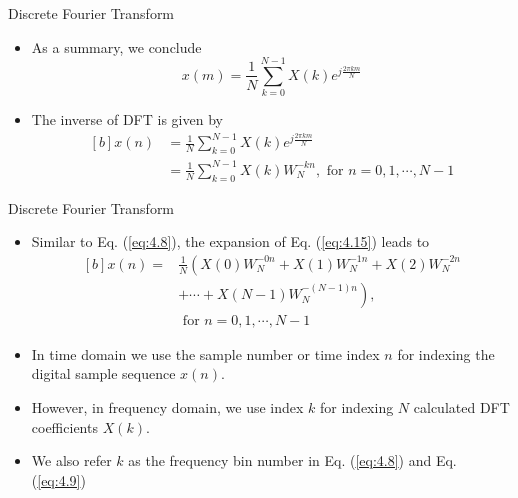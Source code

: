 \documentclass[pdflatex,compress,mathserif]{beamer}
\begin{document}
\begin{frame}{Discrete Fourier Transform}
    \begin{itemize}
        \item As a summary, we conclude
        \begin{equation}
            x(m) = \frac{1}{N} \sum_{k=0}^{N-1} X(k) e^{j\frac{2 \pi km}{N}}
        \end{equation}
        \item The inverse of DFT is given by
        \begin{equation}
            \begin{aligned}[b]
                x(n) &= \frac{1}{N} \sum_{k=0}^{N-1} X(k) e^{j\frac{2 \pi km}{N}} \\
                &= \frac{1}{N} \sum_{k=0}^{N-1} X(k) W_N^{-kn}, \text{ for } n=0,1,\cdots,N-1
            \end{aligned}
            \label{eq:4.15}
        \end{equation}
    \end{itemize}
\end{frame}

\begin{frame}{Discrete Fourier Transform}
    \begin{itemize}
        \item Similar to Eq. (\ref{eq:4.8}), the expansion of Eq. (\ref{eq:4.15}) leads to
        \begin{equation}
            \begin{aligned}[b]
                x(n) =& \frac{1}{N} \left( X(0)  W_N^{-0n} + X(1) W_N^{-1n} + X(2) W_N^{-2n} \right.\\
                & + \cdots + X(N-1) \left. W_N^{-(N-1)n} \right) \text{,} \\
                & \text{ for } n=0,1,\cdots,N-1
            \end{aligned}
        \end{equation}
        \item In time domain we use the sample number or time index $n$ for indexing the digital sample sequence $x(n)$.
        \item However, in frequency domain, we use index $k$ for indexing $N$ calculated DFT coefficients $X(k)$.
        \item We also refer $k$ as the frequency bin number in Eq. (\ref{eq:4.8}) and Eq. (\ref{eq:4.9})
    \end{itemize}
\end{frame}
\end{document}
